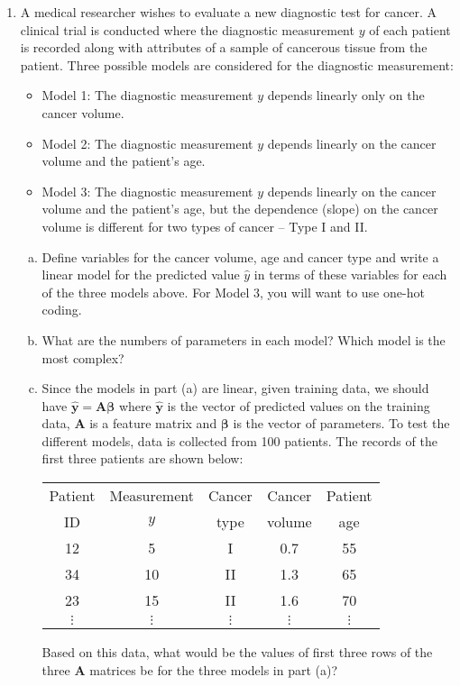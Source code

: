 \documentclass[11pt]{article}
\newcommand{\ybf}{\mathbf{y}}
\newcommand{\Abf}{\mathbf{A}}
\def\betabf{{\boldsymbol \beta}}
\begin{document}
\begin{enumerate}
\item A medical researcher wishes to evaluate a new diagnostic test for cancer.
A clinical trial is conducted where the diagnostic measurement $y$ of each patient is recorded along with
attributes of a sample of cancerous tissue from the patient.
Three possible models are considered for the diagnostic measurement:
\begin{itemize}
\item Model 1:  The diagnostic measurement $y$ depends linearly only on the cancer volume.
\item Model 2:  The diagnostic measurement $y$ depends linearly on the cancer volume and the patient's age.
\item Model 3:  The diagnostic measurement $y$ depends linearly on the cancer volume and the patient's age,
but the dependence (slope) on the cancer volume is different for two types of cancer -- Type I and II.
\end{itemize}


\begin{enumerate}[(a)]
  \item Define variables  for the cancer volume, age and cancer type and write a linear model
  for the predicted value $\hat{y}$ in terms of these variables for each of the three models above.
  For Model 3, you will want to use one-hot coding.

  \item What are the numbers of parameters in each model?  Which model is the most complex?

  \item Since the models in part (a) are linear, given training data,
  we should have $\hat{\ybf} = \Abf\betabf$
  where $\hat{\ybf}$ is the vector of predicted values on the training data,
  $\Abf$ is a feature matrix and $\betabf$ is the vector of parameters.
  To test the different models, data is collected from 100 patients.  The records of the first three patients are shown below:
\begin{center}
\begin{tabular}[h]{|c|c|c|c|c|} \hline
Patient & Measurement & Cancer & Cancer  & Patient \\
 ID &  $y$ &type & volume & age \\ \hline
12 & 5 &  I  & 0.7 & 55  \\ \hline
34 & 10 & II & 1.3 & 65  \\ \hline
23 & 15 & II & 1.6 & 70  \\ \hline
$\vdots$ & $\vdots$ & $\vdots$ & $\vdots$  & $\vdots$  \\ \hline
\end{tabular}
\end{center}
Based on this data, what would be the values of first three rows of the three
$\Abf$ matrices be for the three models in part (a)?


\end{enumerate}
\end{enumerate}
\end{document}

